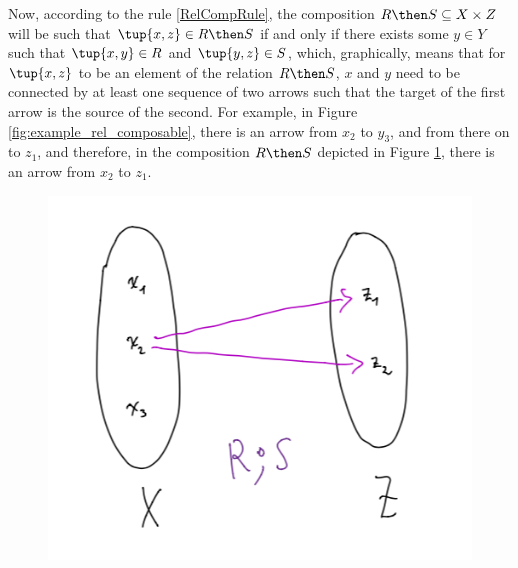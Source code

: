 \begin{center}
\end{center}

Now, according to the rule \ref{RelCompRule}, the composition $R \then S \subseteq X \times Z$ will be such that  $\tup{x,z} \in R \then S$ if and only if there exists some $y \in Y$ such that $\tup{x,y} \in R$ and $\tup{y,z} \in S$, which, graphically, means that for $\tup{x,z}$ to be an element of the relation $R \then S$, $x$ and $y$ need to be connected by at least one sequence of two arrows such that the target of the first arrow is the source of the second. For example, in Figure \ref{fig:example_rel_composable}, there is an arrow from $x_2$ to $y_3$, and from there on to $z_1$, and therefore, in the composition $R \then S$ depicted in Figure \ref{fig:example_rel_composed}, there is an arrow from $x_2$ to $z_1$. 
\begin{figure}[h!]
\centering
 \includegraphics[width=0.5\linewidth]{pics/dist_net_10.png}
 \caption{}
\label{fig:example_rel_composed}
\end{figure}

\begin{center}
\end{center}


